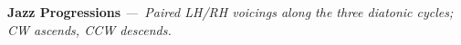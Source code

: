 \documentclass[letterpaper,12pt]{article}
\newcounter{rowct}
\begin{document}
\clearpage


\small
\setcounter{rowct}{0}

\centerline{\fontsize{10}{12}\selectfont\color{flavcol}\textbf{Jazz Progressions} \itshape —\ Paired LH/RH voicings along the three diatonic cycles; CW ascends, CCW descends.}
\vspace{-2mm}

\newcommand{\cychdr}[1]{%
  \rowcolor{#1}%
  {\color{white}\textbf{LH}} & {\color{white}\textbf{RH}} & {\color{white}\textbf{Figure}} & {\color{white}\textbf{CW}} & {\color{white}\textbf{CCW}} & {\color{white}\textbf{Id}} \\
}

\setlength{\tabcolsep}{2pt}\renewcommand{\arraystretch}{1.1}

\newcommand{\cyccol}[2]{\multirow{14}{*}{\rotatebox[origin=c]{90}{\color{white}\textbf{#1}}}\hspace{0pt}}
\end{document}
